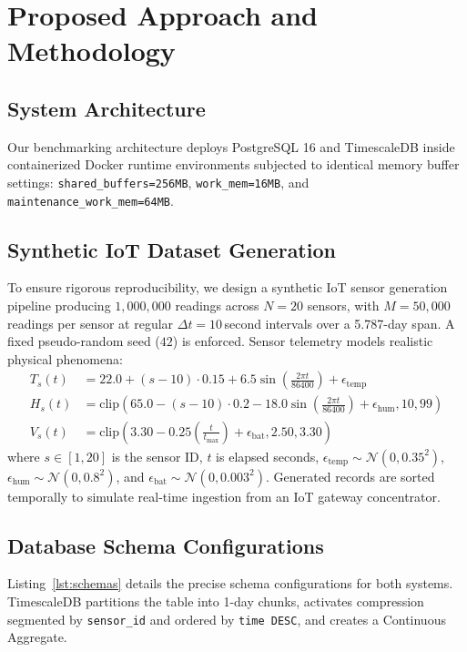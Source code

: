 \documentclass[conference,a4paper]{IEEEtran}
\begin{document}
\section{Proposed Approach and Methodology}

\subsection{System Architecture}
Our benchmarking architecture deploys PostgreSQL 16 and TimescaleDB inside containerized Docker runtime environments subjected to identical memory buffer settings: \texttt{shared\_buffers=256MB}, \texttt{work\_mem=16MB}, and \texttt{maintenance\_work\_mem=64MB}.

\subsection{Synthetic IoT Dataset Generation}
To ensure rigorous reproducibility, we design a synthetic IoT sensor generation pipeline producing $1,000,000$ readings across $N=20$ sensors, with $M=50,000$ readings per sensor at regular $\Delta t = 10$\,second intervals over a 5.787-day span. A fixed pseudo-random seed ($42$) is enforced. Sensor telemetry models realistic physical phenomena:
\begin{align}
    T_s(t) &= 22.0 + (s - 10) \cdot 0.15 + 6.5 \sin\left(\frac{2\pi t}{86400}\right) + \epsilon_{\text{temp}} \\
    H_s(t) &= \mathrm{clip}\left(65.0 - (s - 10) \cdot 0.2 - 18.0 \sin\left(\frac{2\pi t}{86400}\right) + \epsilon_{\text{hum}}, 10, 99\right) \\
    V_s(t) &= \mathrm{clip}\left(3.30 - 0.25 \left(\frac{t}{t_{\max}}\right) + \epsilon_{\text{bat}}, 2.50, 3.30\right)
\end{align}
where $s \in [1, 20]$ is the sensor ID, $t$ is elapsed seconds, $\epsilon_{\text{temp}} \sim \mathcal{N}(0, 0.35^2)$, $\epsilon_{\text{hum}} \sim \mathcal{N}(0, 0.8^2)$, and $\epsilon_{\text{bat}} \sim \mathcal{N}(0, 0.003^2)$. Generated records are sorted temporally to simulate real-time ingestion from an IoT gateway concentrator.

\subsection{Database Schema Configurations}
Listing~\ref{lst:schemas} details the precise schema configurations for both systems. TimescaleDB partitions the table into 1-day chunks, activates compression segmented by \texttt{sensor\_id} and ordered by \texttt{time DESC}, and creates a Continuous Aggregate.
\end{document}
